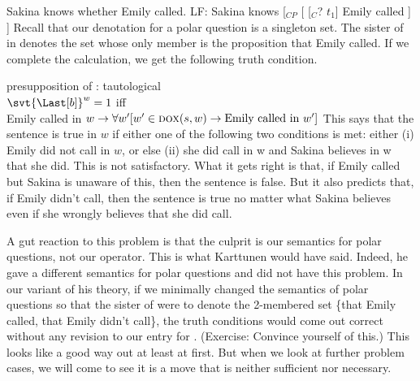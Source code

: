 \pex
\a Sakina knows whether Emily called.
\a LF: Sakina knows [$_{CP}$ [ [$_{C}$? $t_{1}$] Emily called ] ]
\xe
%
Recall that our denotation for a polar question is a singleton set. The sister
of \ans in \Last[b] denotes the set whose only member is the proposition that
Emily called. If we complete the calculation, we get the following truth
condition.

\ex presupposition of \Last[b]: tautological\\
$\svt{\Last[b]}^{w} = 1$ iff\\
Emily called in
$w \rightarrow \forall w' [w'\in\textsc{dox}(s,w) \rightarrow \text{Emily called
  in}\ w']$
\xe
%
This says that the sentence \LLast[a] is true in $w$ if either one of the
following two conditions is met: either (i) Emily did not call in $w$, or else
(ii) she did call in w and Sakina believes in w that she did. This is not
satisfactory. What it gets right is that, if Emily called but Sakina is unaware
of this, then the sentence is false. But it also predicts that, if Emily didn't
call, then the sentence is true no matter what Sakina believes \dash even if she
wrongly believes that she did call.

A gut reaction to this problem is that the culprit is our semantics for polar
questions, not our \ans operator. This is what Karttunen would have said.
Indeed, he gave a different semantics for polar questions and did not have this
problem. %
%
In our variant of his theory, if we minimally changed the semantics of polar
questions so that the sister of \ans were to denote the 2-membered set \{that
Emily called, that Emily didn't call\}, the truth conditions would come out
correct without any revision to our entry for \ans. (Exercise: Convince yourself
of this.) This looks like a good way out \dash at least at first. But when we
look at further problem cases, we will come to see it is a move that is neither
sufficient nor necessary.

